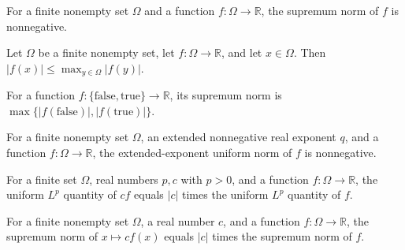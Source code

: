 \begin{theorem}
\label{FABL.uniformLInfinityNorm_nonneg}
\leanok
{}
For a finite nonempty set $\Omega$ and a function $f:\Omega\to\mathbb R$, the supremum
norm of $f$ is nonnegative.
\end{theorem}

\begin{theorem}
\label{FABL.abs_le_uniformLInfinityNorm}
\leanok
{}
Let $\Omega$ be a finite nonempty set, let $f\colon\Omega\to\mathbb R$, and let
$x\in\Omega$. Then $|f(x)|\leq \max_{y\in\Omega}|f(y)|$.
\end{theorem}

\begin{theorem}
\label{FABL.uniformLInfinityNorm_bool}
\leanok
{}
For a function $f:\{\mathrm{false},\mathrm{true}\}\to\mathbb R$, its supremum norm is
$\max\{|f(\mathrm{false})|,|f(\mathrm{true})|\}$.
\end{theorem}

\begin{theorem}
\label{FABL.uniformLpNormENNReal_nonneg}
\leanok
{}
For a finite nonempty set $\Omega$, an extended nonnegative real exponent $q$, and a
function $f:\Omega\to\mathbb R$, the extended-exponent uniform norm of $f$ is
nonnegative.
\end{theorem}

\begin{theorem}
\label{FABL.uniformLpNorm_const_mul}
\leanok
{}
For a finite set $\Omega$, real numbers $p,c$ with $p>0$, and a function
$f:\Omega\to\mathbb{R}$, the uniform $L^p$ quantity of $cf$ equals $|c|$ times the
uniform $L^p$ quantity of $f$.
\end{theorem}

\begin{theorem}
\label{FABL.uniformLInfinityNorm_const_mul}
\leanok
{}
For a finite nonempty set $\Omega$, a real number $c$, and a function
$f:\Omega\to\mathbb R$, the supremum norm of $x\mapsto c f(x)$ equals $|c|$ times the
supremum norm of $f$.
\end{theorem}

